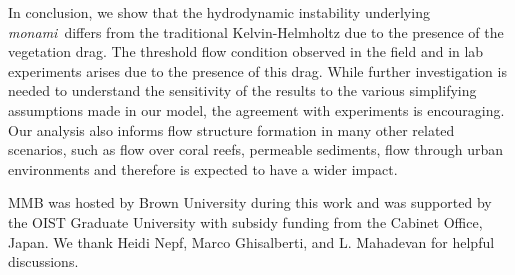 \documentclass{jfm}
\newcommand{\monami}{\textit{monami}}
\begin{document}

In conclusion, we show that the hydrodynamic instability underlying \monami ~differs from the traditional Kelvin-Helmholtz due to the presence of the vegetation drag. 
The threshold flow condition observed in the field and in lab experiments arises due to the presence of this drag. 
While further investigation is needed to understand the sensitivity of the results to the various simplifying assumptions made in our model, the agreement with experiments is encouraging.
Our analysis also informs flow structure formation in many other related scenarios, such as flow over coral reefs, permeable sediments, flow through urban environments and therefore is expected to have a wider impact.

\acknowledgments
MMB was hosted by Brown University during this work and was supported by the OIST Graduate University with subsidy funding from the Cabinet Office, Japan. We thank Heidi Nepf, Marco Ghisalberti, and L. Mahadevan for helpful discussions.

{}

% 
%
\end{document}
